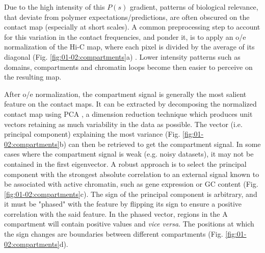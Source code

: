 Due to the high intensity of this $P(s)$ gradient, patterns of biological relevance, that deviate from polymer expectations/predictions, are often obscured on the contact map (especially at short scales). A common preprocessing step to account for this variation in the contact frequencies, and ponder it, is to apply an \acrfull{o/e} normalization of the Hi-C map, where each pixel is divided by the average of its diagonal (Fig. \ref{fig:01-02:compartments}a) \cite{calandrelliGITAROpenSource2018,forcatoComparisonComputationalMethods2017}. Lower intensity patterns such as domains, compartments and chromatin loops become then easier to perceive on the resulting map.

After \acrshort{o/e} normalization, the compartment signal is generally the most salient feature on the contact maps. It can be extracted by decomposing the normalized contact map using \acrfull{PCA} \cite{lajoieHitchhikerGuideHiC2015}, a dimension reduction technique which produces unit vectors retaining as much variability in the data as possible. The vector (i.e. principal component) explaining the most variance (Fig. \ref{fig:01-02:compartments}b) can then be retrieved to get the compartment signal. In some cases where the compartment signal is weak (e.g. noisy datasets), it may not be contained in the first eigenvector. A robust approach is to select the principal component with the strongest absolute correlation to an external signal known to be associated with active chromatin, such as gene expression or GC content \cite{sergeyvenevOpen2cCooltoolsV02021} (Fig. \ref{fig:01-02:compartments}c). The sign of the principal component is arbitrary, and it must be "phased" with the feature by flipping its sign to ensure a positive correlation with the said feature. In the phased vector, regions in the A compartment will contain positive values and \textit{vice versa}. The positions at which the sign changes are boundaries between different compartments (Fig. \ref{fig:01-02:compartments}d).


